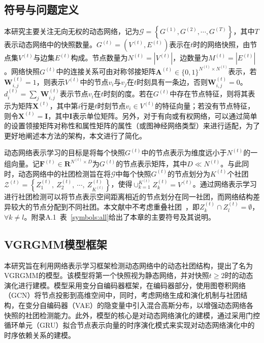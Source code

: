 \subsection{符号与问题定义}
本研究主要关注无向无权的动态网络，记为$\mathcal{G}=\left\{G^{(1)},G^{(2)},\cdots,G^{(T)}\right\}$，其中$T$表示动态网络中的快照数量。$G^{(t)} = (V^{(t)}, E^{(t)})$表示在$t$时的网络快照，由节点集$V^{(t)}$与边集$E^{(t)}$构成。节点数量为$N^{(t)} = |V^{(t)}|$，边数量为$M^{(t)} = |E^{(t)}|$。网络快照$G^{(t)}$中的连接关系可由对称邻接矩阵$\mathbf{A}^{(t)} \in \{0,1\}^{N^{(t)}\times N^{(t)}}$表示，若$\mathbf{W}_{i,j}^{(t)} = 1$，则表示$V^{(t)}$中的节点$v_i$与$v_j$在$t$时刻具有一条边，否则$\mathbf{W}_{i,j}^{(t)} = 0$。$d^{(t)}_i = \sum_{j}\mathbf{W}_{i,j}^{(t)}$表示节点$v_i$在$t$时刻的度。若在$G^{(t)}$中存在节点特征，则将其表示为矩阵$\mathbf{X}^{(t)}$，其中第$i$行是$t$时刻节点$v_i \in V^{(t)}$的特征向量；若没有节点特征，则令$\mathbf{X}^{(t)} = \mathbf{I}$，其中$\mathbf{I}$表示单位矩阵。另外，对于有向或有权网络，可以通过简单的设置领接矩阵对称性和属性矩阵的属性（或图神经网络类型）来进行适配，为了更好地阐述本方法的架构，本文进行了简化。

动态网络表示学习的目标是将每个快照$G^{(t)}$中的节点表示为维度远小于$N^{(t)}$的一组向量。记$\mathbf{F}^{(t)} \in \boldsymbol{R}^{N^{(t)}\times D}$为$G^{(t)}$的节点表示矩阵，其中$D \ll N^{(t)}$。与此同时，动态网络中的社团检测旨在将$\mathcal{G}$中每个快照$G^{(t)}$的节点划分为$K^{(t)}$个社团$\mathcal{Z}^{(t)} = \left\{Z_{1}^{(t)},\ Z_{2}^{(t)},\ \cdots,\ Z_{K^{(t)}}^{(t)} \right\}$，使得$\cup_{k=1}^{K^{(t)}} Z_{k}^{(t)} = V^{(t)}$。通过网络表示学习进行社团检测可以将节点表示空间距离相近的节点划分在同一社团，而网络结构差异较大的节点分配到不同社团。本文献中不考虑重叠社团~\cite{10526486}，即$Z_{k}^{(t)} \cap Z_{l}^{(t)} = \emptyset$，$\forall k \neq l$。附录A.1~表~\ref{symbols:all}给出了本章的主要符号及其说明。

\subsection{VGRGMM模型框架}

本研究旨在利用网络表示学习框架检测动态网络中的动态社团结构，提出了名为VGRGMM的模型。该模型将第一个快照视为静态网络，并对快照$t \ge 2$时的动态演化进行建模。模型采用变分自编码器框架，在编码器部分，使用图卷积网络（GCN）\cite{Kipf.2017.Welling}将节点投影到高维空间中，同时，考虑网络生成和演化机制与社团结构，在变分自编码器（VAE）\cite{kingma2013auto}的隐变量中引入混合高斯分布，以增强动态网络各快照的社团检测能力。此外，模型的核心是对动态网络演化的建模，通过采用门控循环单元（GRU）拟合节点表示向量的时序演化模式来实现对动态网络演化中的时序依赖关系的建模。
 

